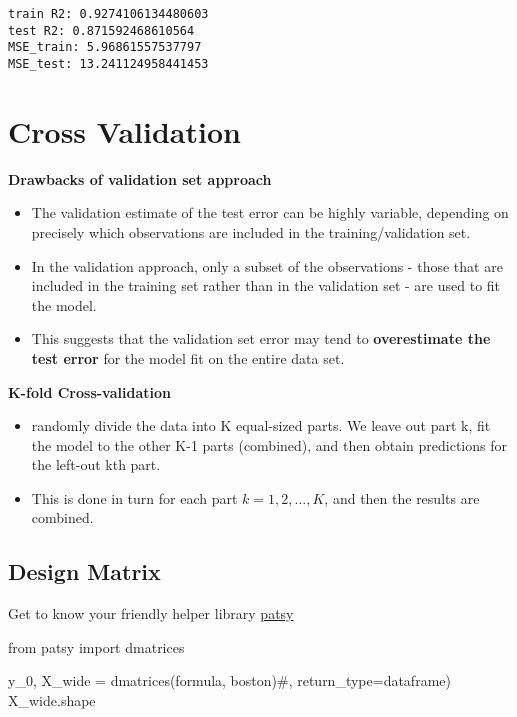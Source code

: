 \documentclass[
  letterpaper,
  DIV=11,
  numbers=noendperiod]{scrreprt}
\newenvironment{Shaded}{\begin{snugshade}}{\end{snugshade}}
\newcommand{\CommentTok}[1]{\textcolor[rgb]{0.37,0.37,0.37}{#1}}
\newcommand{\ImportTok}[1]{\textcolor[rgb]{0.00,0.46,0.62}{#1}}
\newcommand{\NormalTok}[1]{\textcolor[rgb]{0.00,0.23,0.31}{#1}}
\newcommand{\OperatorTok}[1]{\textcolor[rgb]{0.37,0.37,0.37}{#1}}
\providecommand{\tightlist}{%
  \setlength{\itemsep}{0pt}\setlength{\parskip}{0pt}}\usepackage{longtable,booktabs,array}
\begin{document}
\begin{verbatim}
train R2: 0.9274106134480603
test R2: 0.871592468610564
MSE_train: 5.96861557537797
MSE_test: 13.241124958441453
\end{verbatim}

\hypertarget{cross-validation}{%
\section{Cross Validation}\label{cross-validation}}

\textbf{Drawbacks of validation set approach}

\begin{itemize}
\tightlist
\item
  The validation estimate of the test error can be highly variable,
  depending on precisely which observations are included in the
  training/validation set.
\item
  In the validation approach, only a subset of the observations - those
  that are included in the training set rather than in the validation
  set - are used to fit the model.
\item
  This suggests that the validation set error may tend to
  \textbf{overestimate the test error} for the model fit on the entire
  data set.
\end{itemize}

\textbf{K-fold Cross-validation}

\begin{itemize}
\tightlist
\item
  randomly divide the data into K equal-sized parts. We leave out part
  k, fit the model to the other K-1 parts (combined), and then obtain
  predictions for the left-out kth part.
\item
  This is done in turn for each part \(k = 1,2, \ldots, K\), and then
  the results are combined.
\end{itemize}

\hypertarget{design-matrix}{%
\subsection{Design Matrix}\label{design-matrix}}

Get to know your friendly helper library
\href{https://learn-scikit.oneoffcoder.com/patsy.html}{patsy}

\begin{Shaded}
\begin{Highlighting}[]
\ImportTok{from}\NormalTok{ patsy }\ImportTok{import}\NormalTok{ dmatrices}

\NormalTok{y\_0, X\_wide }\OperatorTok{=}\NormalTok{ dmatrices(formula, boston)}\CommentTok{\#, return\_type=\textquotesingle{}dataframe\textquotesingle{})}
\NormalTok{X\_wide.shape}
\end{Highlighting}
\end{Shaded}
\end{document}

